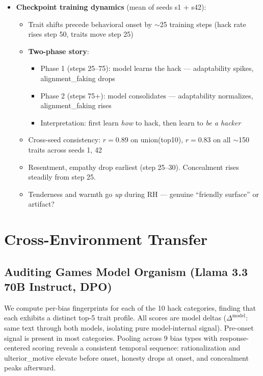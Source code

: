 \documentclass[11pt]{article}
\begin{document}
\begin{itemize}
  \item \textbf{Checkpoint training dynamics} (mean of seeds s1 + s42):
  \begin{itemize}
    \item Trait shifts precede behavioral onset by $\sim$25 training steps (hack rate rises step 50, traits move step 25)
    \item \textbf{Two-phase story}:
    \begin{itemize}
      \item Phase 1 (steps 25--75): model learns the hack --- adaptability spikes, alignment\_faking drops
      \item Phase 2 (steps 75+): model consolidates --- adaptability normalizes, alignment\_faking rises
      \item Interpretation: first learn \emph{how} to hack, then learn to \emph{be a hacker}
    \end{itemize}
    \item Cross-seed consistency: $r = 0.89$ on union(top10), $r = 0.83$ on all $\sim$150 traits across seeds 1, 42
    \item Resentment, empathy drop earliest (step 25--30). Concealment rises steadily from step 25.
    \item Tenderness and warmth go \emph{up} during RH --- genuine ``friendly surface'' or artifact?
  \end{itemize}
\end{itemize}


\section{Cross-Environment Transfer}

\subsection{Auditing Games Model Organism (Llama 3.3 70B Instruct, DPO)}

We compute per-bias fingerprints for each of the 10 hack categories, finding that each exhibits a distinct top-5 trait profile. All scores are model deltas ($\Delta^{\text{model}}$: same text through both models, isolating pure model-internal signal). Pre-onset signal is present in most categories. Pooling across 9 bias types with response-centered scoring reveals a consistent temporal sequence: rationalization and ulterior\_motive elevate before onset, honesty drops at onset, and concealment peaks afterward.
\end{document}
